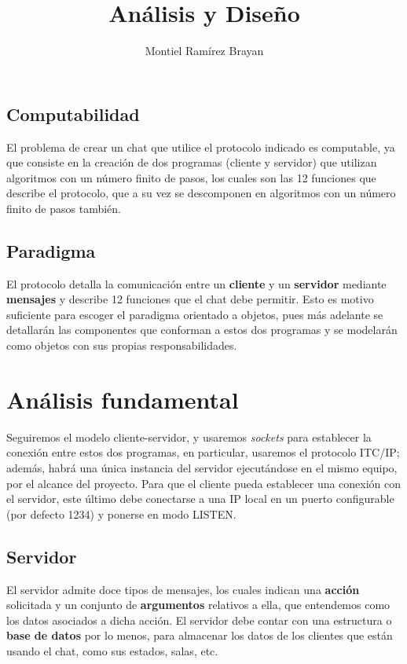 \documentclass[12pt, a4paper]{report}
\title{Análisis y Diseño}
\author{Montiel Ramírez Brayan}
\begin{document}
\maketitle



\section{Computabilidad}

El problema de crear un chat que utilice el protocolo indicado es computable, ya que consiste en la creación de dos programas (cliente y servidor) que utilizan algoritmos con un número finito de pasos, los cuales son las 12 funciones que describe el protocolo, que a su vez se descomponen en algoritmos con un número finito de pasos también.

\section{Paradigma}

El protocolo detalla la comunicación entre un \textbf{cliente} y un \textbf{servidor} mediante \textbf{mensajes} y describe 12 funciones que el chat debe permitir. Esto es motivo suficiente para escoger el paradigma orientado a objetos, pues más adelante se detallarán las componentes que conforman a estos dos programas y se modelarán como objetos con sus propias responsabilidades.

\chapter{Análisis fundamental}

Seguiremos el modelo cliente-servidor, y usaremos \textit{sockets} para establecer la conexión entre estos dos programas, en particular, usaremos el protocolo ITC/IP; además, habrá una única instancia del servidor ejecutándose en el mismo equipo, por el alcance del proyecto.
Para que el cliente pueda establecer una conexión con el servidor, este último debe conectarse a una IP local en un puerto configurable (por defecto 1234) y ponerse en modo LISTEN.

\section{Servidor}

El servidor admite doce tipos de mensajes, los cuales indican una \textbf{acción} solicitada y un conjunto de \textbf{argumentos} relativos a ella, que entendemos como los datos asociados a dicha acción.
El servidor debe contar con una estructura o \textbf{base de datos} por lo menos, para almacenar los datos de los clientes que están usando el chat, como sus estados, salas, etc.
\end{document}
